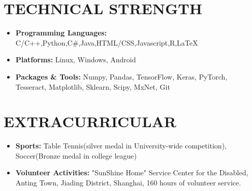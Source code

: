 \documentclass[11pt,a4paper,roman]{moderncv}        %
\begin{document}
\section{TECHNICAL STRENGTH}
\begin{minipage}{\maincolumnwidth}%
	\small{
		\begin{itemize}
			\item \textbf{Programming Languages:} C/C++,Python,C\#,Java,HTML/CSS,Javascript,R,\LaTeX
			\item \textbf{Platforms:} Linux, Windows, Android
			\item \textbf{Packages \& Tools:} Numpy, Pandas, TensorFlow, Keras, PyTorch, Tesseract, Matplotlib, Sklearn, Scipy, MxNet, Git
	\end{itemize}}%
\end{minipage}%

\section{EXTRACURRICULAR}
\begin{minipage}{\maincolumnwidth}%
	\small{
    	\begin{itemize}
          \item \textbf{Sports:} Table Tennis(silver medal in University-wide competition), Soccer(Bronze medal in college league)
          \item \textbf{Volunteer Activities: }"SunShine Home" Service Center for the Disabled, Anting Town, Jiading District, Shanghai, 160 hours of volunteer service.
		\end{itemize}}%
\end{minipage}%
      
%


\end{document}
